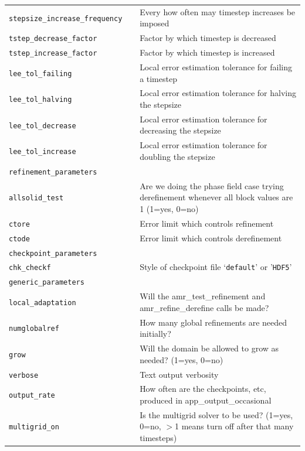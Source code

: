 \documentclass[paper=a4, fontsize=11pt,twoside,bibtotoc]{scrartcl}		%
\begin{document}
\begin{center}
\begin{longtable}{|lc|p{}|}
  		\texttt{stepsize\_increase\_frequency   }& & Every how often may timestep increases be imposed\\
		\texttt{tstep\_decrease\_factor}		&& Factor by which timestep is decreased\\
		\texttt{tstep\_increase\_factor}		&& Factor by which timestep is increased\\
  		\texttt{lee\_tol\_failing }& &Local error estimation tolerance for failing a timestep\\
  		\texttt{lee\_tol\_halving }& &Local error estimation tolerance for halving the stepsize\\
  		\texttt{lee\_tol\_decrease  }& & Local error estimation tolerance for decreasing the stepsize\\
  		\texttt{lee\_tol\_increase  }& & Local error estimation tolerance for doubling the stepsize\\
		\hline
		\multicolumn{3}{|l|}{\texttt{refinement\_parameters}}\\
		\hline
  		\texttt{allsolid\_test }& &   Are we doing the phase field case trying derefinement whenever all block values are 1 (1=yes, 0=no)\\
  		\texttt{ctore             }& & Error limit which controls refinement\\
  		\texttt{ctode            }& & Error limit which controls derefinement\\
		\hline
		\multicolumn{3}{|l|}{\texttt{checkpoint\_parameters}}\\
		\hline
  		\texttt{chk\_checkf }& & Style of checkpoint file `\texttt{default}' or '\texttt{HDF5}'\\
		\hline
                \multicolumn{3}{|l|}{\texttt{generic\_parameters}}\\
		\hline
		\texttt{local\_adaptation}& &  Will the amr\_test\_refinement and amr\_refine\_derefine calls be made?\\
		\texttt{numglobalref}& &  How many global refinements are needed initially?\\
		\texttt{grow }& & Will the domain be allowed to grow as needed? (1=yes, 0=no)\\
		\texttt{verbose}& &  Text output verbosity\\
		\texttt{output\_rate}& &  How often are the checkpoints, etc, produced in app\_output\_occasional\\
		\texttt{multigrid\_on}& & Is the multigrid solver to be used? (1=yes, 0=no, $>$1 means turn off after that many timesteps)\\
		\hline
	\end{longtable}
\end{center}
\end{document}
